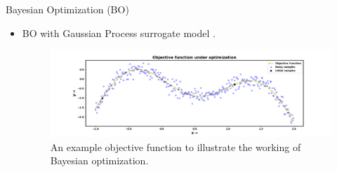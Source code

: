 \documentclass[10pt]{beamer}
\begin{document}
\begin{frame}{Bayesian Optimization (BO)}

\begin{itemize}

\item BO with Gaussian Process surrogate model \cite{martin_bo_tutorial}.
    
\begin{figure}[!ht]
\centering
\includegraphics[width=\linewidth]{images/BO_objective.png}
\captionsetup{justification=justified}
\caption[An example objective function under BO]{An example objective function to illustrate the working of Bayesian optimization.}
\label{fig:BO_objective}
\end{figure}

\end{itemize}

\end{frame}
\end{document}
